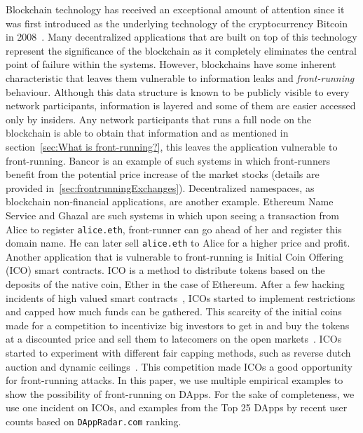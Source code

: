 
Blockchain technology has received an exceptional amount of attention since it was first introduced as the underlying technology of the cryptocurrency Bitcoin in 2008~\cite{nakamoto2008bitcoin}. Many decentralized applications that are built on top of this technology represent the significance of the blockchain as it completely eliminates the central point of failure within the systems. However, blockchains have some inherent characteristic that leaves them vulnerable to information leaks and \emph{front-running} behaviour. Although this data structure is known to be publicly visible to every network participants, information is layered and some of them are easier accessed only by insiders. Any network participants that runs a full node on the blockchain is able to obtain that information and as mentioned in section~\ref{sec:What is front-running?}, this leaves the application vulnerable to front-running. %
Bancor \cite{hertzog2017bancor} is an example of such systems in which front-runners benefit from the potential price increase of the market stocks (details are provided in~\ref{sec:frontrunningExchanges}). Decentralized namespaces, as blockchain non-financial applications, are another example. Ethereum Name Service and Ghazal \cite{moosavighazal} are such systems in which upon seeing a transaction from Alice to register \texttt{alice.eth}, front-runner can go ahead of her and register this domain name. He can later sell \texttt{alice.eth} to Alice for a higher price and profit.
Another application that is vulnerable to front-running is Initial Coin Offering (ICO) smart contracts. ICO is a method to distribute tokens based on the deposits of the native coin, Ether in the case of Ethereum. After a few hacking incidents of high valued smart contracts~\cite{siegel2016daohack}, ICOs started to implement restrictions and capped how much funds can be gathered. This scarcity of the initial coins made for a competition to incentivize big investors to get in and buy the tokens at a discounted price and sell them to latecomers on the open markets~\cite{zetzsche2018ico, li2018initial}. ICOs started to experiment with different fair capping methods, such as reverse dutch auction and dynamic ceilings~\cite{kaal2017initial}.  This competition made ICOs a good opportunity for front-running attacks.  In this paper, we use multiple empirical examples to show the possibility of front-running on DApps. For the sake of completeness, we use one incident on ICOs, and examples from the Top 25 DApps by recent user counts based on \texttt{DAppRadar.com} ranking. 

